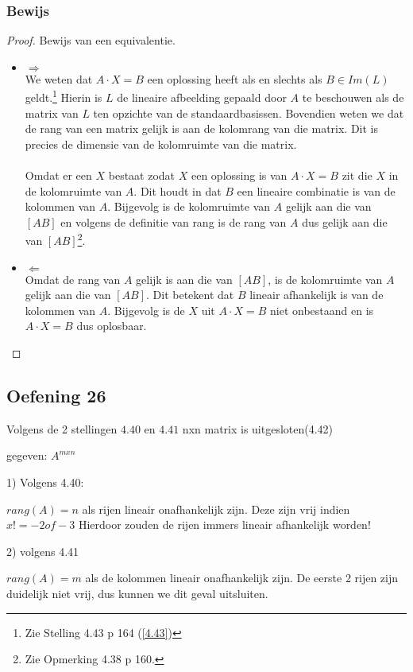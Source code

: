 \documentclass[lineaire_algebra_oplossingen.tex]{subfiles}
\begin{document}
\subsubsection*{Bewijs}
\begin{proof}
Bewijs van een equivalentie.
\begin{itemize}
\item $\Rightarrow$\\
We weten dat $A\cdot X = B$ een oplossing heeft als en slechts als $B \in Im(L)$ geldt.\footnote{Zie Stelling 4.43 p 164 (\ref{4.43})} Hierin is $L$ de lineaire afbeelding gepaald door $A$ te beschouwen als de matrix van $L$ ten opzichte van de standaardbasissen.
Bovendien weten we dat de rang van een matrix gelijk is aan de kolomrang van die matrix.
Dit is precies de dimensie van de kolomruimte van die matrix.\\\\
Omdat er een $X$ bestaat zodat $X$ een oplossing is van $A\cdot X = B$ zit die $X$ in de kolomruimte van $A$. Dit houdt in dat $B$ een lineaire combinatie is van de kolommen van $A$. Bijgevolg is de kolomruimte van $A$ gelijk aan die van $[A B]$ en volgens de definitie van rang is de rang van $A$ dus gelijk aan die van $[A B]$\footnote{Zie Opmerking 4.38 p 160.}.

\item $\Leftarrow$\\
Omdat de rang van $A$ gelijk is aan die van $[A B]$, is de kolomruimte van $A$ gelijk aan die van $[A B]$. Dit betekent dat $B$ lineair afhankelijk is van de kolommen van $A$. Bijgevolg is de $X$ uit $A\cdot X = B$ niet onbestaand en is $A\cdot X = B$ dus oplosbaar.
\end{itemize}
\end{proof}


\subsection{Oefening 26}

Volgens de 2 stellingen $4.40$ en $4.41$ nxn matrix is uitgesloten(4.42)

gegeven: $ A ^ {m x n} $

1) Volgens 4.40: 

$rang(A) = n $ als rijen lineair onafhankelijk zijn.
Deze zijn vrij indien $x != -2 of -3$ Hierdoor zouden de rijen immers lineair afhankelijk worden! 

2) volgens 4.41

$rang(A) = m $ als de kolommen lineair onafhankelijk zijn. De eerste 2 rijen zijn duidelijk niet vrij, dus kunnen we dit geval uitsluiten.
\end{document}
